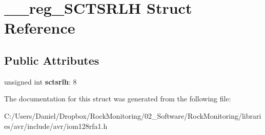\hypertarget{struct____reg___s_c_t_s_r_l_h}{}\section{\+\_\+\+\_\+reg\+\_\+\+S\+C\+T\+S\+R\+LH Struct Reference}
\label{struct____reg___s_c_t_s_r_l_h}
\subsection*{Public Attributes}
\begin{DoxyCompactItemize}
\item 
unsigned int {\bfseries sctsrlh}\+: 8\hypertarget{struct____reg___s_c_t_s_r_l_h_a43956685616e9783cbeaa18aaac55a9b}{}\label{struct____reg___s_c_t_s_r_l_h_a43956685616e9783cbeaa18aaac55a9b}

\end{DoxyCompactItemize}


The documentation for this struct was generated from the following file\+:\begin{DoxyCompactItemize}
\item 
C\+:/\+Users/\+Daniel/\+Dropbox/\+Rock\+Monitoring/02\+\_\+\+Software/\+Rock\+Monitoring/libraries/avr/include/avr/iom128rfa1.\+h\end{DoxyCompactItemize}
